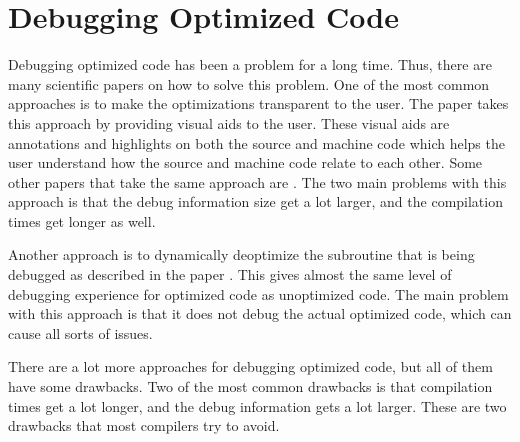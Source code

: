 


\section{Debugging Optimized Code}


Debugging optimized code has been a problem for a long time.
Thus, there are many scientific papers on how to solve this problem.
One of the most common approaches is to make the optimizations transparent to the user.
The paper \cite{edselc.2-52.0-8497669319919920107} takes this approach by providing visual aids to the user.
These visual aids are annotations and highlights on both the source and machine code which helps the user understand how the source and machine code relate to each other.
Some other papers that take the same approach are \cite{adl1996source, edselc.2-52.0-002842706219940105}.
The two main problems with this approach is that the debug information size get a lot larger, and the compilation times get longer as well.


Another approach is to dynamically deoptimize the subroutine that is being debugged as described in the paper \cite{edselc.2-52.0-002699386519920107}.
This gives almost the same level of debugging experience for optimized code as unoptimized code.
The main problem with this approach is that it does not debug the actual optimized code, which can cause all sorts of issues.


There are a lot more approaches for debugging optimized code, but all of them have some drawbacks.
Two of the most common drawbacks is that compilation times get a lot longer, and the debug information gets a lot larger.
These are two drawbacks that most compilers try to avoid.



